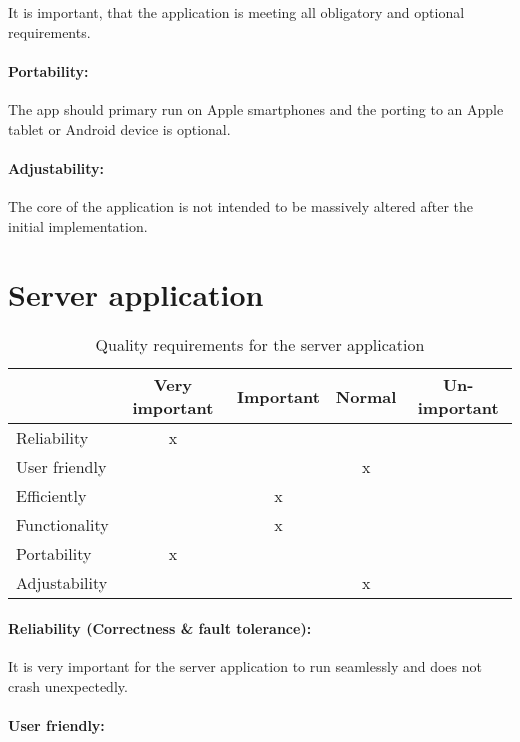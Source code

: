It is important, that the application is meeting all obligatory and optional requirements.

\paragraph{Portability:}

The app should primary run on Apple smartphones and the porting to an Apple tablet or Android device is optional.

\paragraph{Adjustability:}

The core of the application is not intended to be massively altered after the initial implementation.  

\section{Server application}
\begin{table}[h]
  \begin{tabular}{| l || c | c | c | c |}
      \hline
      & Very important & Important & Normal & Un-important \\ \hline \hline
      Reliability & x & & & \\ \hline
      User friendly & & & x & \\ \hline
      Efficiently & & x & & \\ \hline
      Functionality & & x & & \\ \hline
      Portability & x & & & \\ \hline
      Adjustability & & & x & \\ \hline
  \end{tabular}
  \caption{Quality requirements for the server application}
\end{table}

\paragraph{Reliability (Correctness \& fault tolerance):}

It is very important for the server application to run seamlessly and does not crash unexpectedly.

\paragraph{User friendly:}

